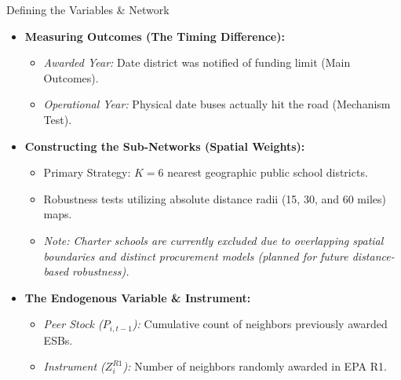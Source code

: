 \documentclass[aspectratio=169]{beamer}
\begin{document}
\begin{frame}{Defining the Variables \& Network}
    \begin{itemize}
        \item \textbf{Measuring Outcomes (The Timing Difference):}
        \begin{itemize}
            \item \textit{Awarded Year:} Date district was notified of funding limit (Main Outcomes).
            \item \textit{Operational Year:} Physical date buses actually hit the road (Mechanism Test).
        \end{itemize}
        \vspace{0.2cm}
        \item \textbf{Constructing the Sub-Networks (Spatial Weights):}
        \begin{itemize}
            \item Primary Strategy: $K=6$ nearest geographic public school districts.
            \item Robustness tests utilizing absolute distance radii (15, 30, and 60 miles) maps.
            \item \textit{Note: Charter schools are currently excluded due to overlapping spatial boundaries and distinct procurement models (planned for future distance-based robustness).}
        \end{itemize}
        \vspace{0.2cm}
        \item \textbf{The Endogenous Variable \& Instrument:}
        \begin{itemize}
            \item \textit{Peer Stock ($P_{i,t-1}$):} Cumulative count of neighbors previously awarded ESBs.
            \item \textit{Instrument ($Z_i^{R1}$):} Number of neighbors randomly awarded in EPA R1.
        \end{itemize}
    \end{itemize}
\end{frame}
\end{document}
